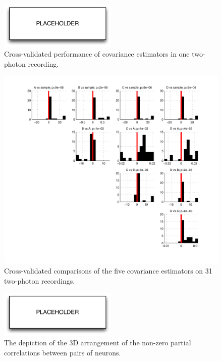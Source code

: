 \begin{figure}[htp]
\centering
\includegraphics[width=0.5\textwidth]{figures/placeholder.pdf}
\caption{
Cross-validated performance of covariance estimators in one two-photon recording.
}\label{fig:04}
\end{figure} 


\begin{figure}[htp]
\centering
\includegraphics[width=1.0\textwidth]{figures/Figure5.pdf}
\caption{
Cross-validated comparisons of the five covariance estimators on 31 two-photon recordings. 
}\label{fig:05}
\end{figure} 

\begin{figure}[htp]
\centering
\includegraphics[width=0.5\textwidth]{figures/placeholder}
\caption{
The depiction of the 3D arrangement of the non-zero partial correlations between pairs of neurons.
}\label{fig:06}
\end{figure} 